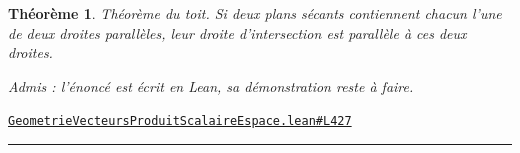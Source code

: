\documentclass[11pt,a4paper]{article}
\theoremstyle{definition}
\theoremstyle{plain}
\newtheorem{theoreme}{Théorème}
\newcommand{\admis}{\par\smallskip\noindent\textit{Admis : l'énoncé est écrit en Lean, sa démonstration reste à faire.}\par}
\newcommand{\source}[2]{\par\smallskip\noindent\hfill{\footnotesize\href{#1}{\texttt{#2}}}\par\smallskip}
\begin{document}
\begin{theoreme}
\emph{Théorème du toit.} Si deux plans sécants contiennent chacun l'une de deux droites
parallèles, leur droite d'intersection est parallèle à ces deux droites.
\end{theoreme}
\admis
\source{https://github.com/Commutator-IO/learn-lean/blob/main/courses/02-lycee/08-geometrie-vecteurs-produit-scalaire-espace/GeometrieVecteursProduitScalaireEspace.lean\#L427}{GeometrieVecteursProduitScalaireEspace.lean\#L427}

\noindent\rule{0.35\linewidth}{0.4pt}\par
{}
\end{document}
